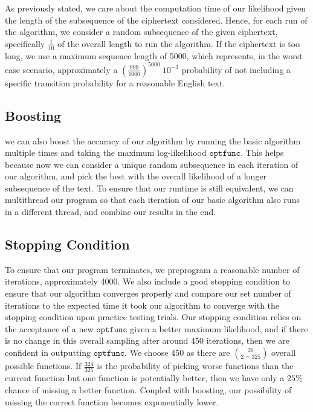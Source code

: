 \documentclass[11pt]{paper}
\numberwithin{equation}{section} %
\numberwithin{figure}{section} %
\numberwithin{table}{section} %
\begin{document}
As previously stated, we care about the computation time of our likelihood given the length of the subsequence of the ciphertext considered. Hence, for each run of the algorithm, we consider a random subsequence of the given ciphertext, specifically $\frac{1}{10}$ of the overall length to run the algorithm. If the ciphertext is too long, we use a maximum sequence length of 5000, which represents, in the worst case scenario, approximately a $(\frac{999}{1000})^{5000} ~ 10^{-3}$ probability of not including a specific transition probability for a reasonable English text.

\subsection{Boosting}

we can also boost the accuracy of our algorithm by running the basic algorithm multiple times and taking the maximum log-likelihood $\texttt{optfunc}$. This helps because now we can consider a unique random subsequence in each iteration of our algorithm, and pick the best with the overall likelihood of a longer subsequence of the text. To ensure that our runtime is still equivalent, we can multithread our program so that each iteration of our basic algorithm also runs in a different thread, and combine our results in the end.

\subsection{Stopping Condition}

To ensure that our program terminates, we preprogram a reasonable number of iterations, approximately 4000. We also include a good stopping condition to ensure that our algorithm converges properly and compare our set number of iterations to the expected time it took our algorithm to converge with the stopping condition upon practice testing trials. Our stopping condition relies on the acceptance of a new $\texttt{optfunc}$ given a better maximum likelihood, and if there is no change in this overall sampling after around 450 iterations, then we are confident in outputting $\texttt{optfunc}$. We choose 450 as there are $26 \choose 2 = 325$ overall possible functions. If $\frac{324}{325}$ is the probability of picking worse functions than the current function but one function is potentially better, then we have only a $25\%$ chance of missing a better function. Coupled with boosting, our possibility of missing the correct function becomes exponentially lower.
\end{document}
